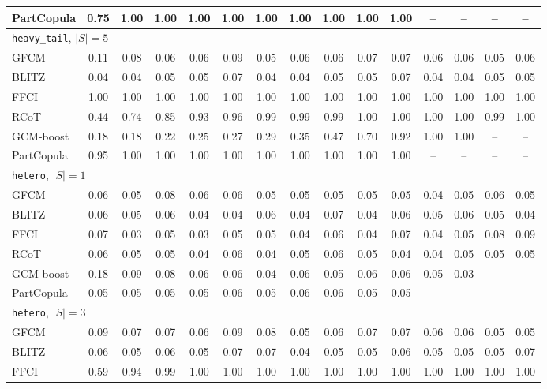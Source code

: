 \begin{longtable}{l*{14}{c}}
PartCopula & 0.75 & 1.00 & 1.00 & 1.00 & 1.00 & 1.00 & 1.00 & 1.00 & 1.00 & 1.00 & -- & -- & -- & -- \\
\midrule \multicolumn{15}{l}{\texttt{heavy\_tail}, $|S|=5$}\\
GFCM & 0.11 & 0.08 & 0.06 & 0.06 & 0.09 & 0.05 & 0.06 & 0.06 & 0.07 & 0.07 & 0.06 & 0.06 & 0.05 & 0.06 \\
BLITZ & 0.04 & 0.04 & 0.05 & 0.05 & 0.07 & 0.04 & 0.04 & 0.05 & 0.05 & 0.07 & 0.04 & 0.04 & 0.05 & 0.05 \\
FFCI & 1.00 & 1.00 & 1.00 & 1.00 & 1.00 & 1.00 & 1.00 & 1.00 & 1.00 & 1.00 & 1.00 & 1.00 & 1.00 & 1.00 \\
RCoT & 0.44 & 0.74 & 0.85 & 0.93 & 0.96 & 0.99 & 0.99 & 0.99 & 1.00 & 1.00 & 1.00 & 1.00 & 0.99 & 1.00 \\
GCM-boost & 0.18 & 0.18 & 0.22 & 0.25 & 0.27 & 0.29 & 0.35 & 0.47 & 0.70 & 0.92 & 1.00 & 1.00 & -- & -- \\
PartCopula & 0.95 & 1.00 & 1.00 & 1.00 & 1.00 & 1.00 & 1.00 & 1.00 & 1.00 & 1.00 & -- & -- & -- & -- \\
\midrule \multicolumn{15}{l}{\texttt{hetero}, $|S|=1$}\\
GFCM & 0.06 & 0.05 & 0.08 & 0.06 & 0.06 & 0.05 & 0.05 & 0.05 & 0.05 & 0.05 & 0.04 & 0.05 & 0.06 & 0.05 \\
BLITZ & 0.06 & 0.05 & 0.06 & 0.04 & 0.04 & 0.06 & 0.04 & 0.07 & 0.04 & 0.06 & 0.05 & 0.06 & 0.05 & 0.04 \\
FFCI & 0.07 & 0.03 & 0.05 & 0.03 & 0.05 & 0.05 & 0.04 & 0.06 & 0.04 & 0.07 & 0.04 & 0.05 & 0.08 & 0.09 \\
RCoT & 0.06 & 0.05 & 0.05 & 0.04 & 0.06 & 0.04 & 0.05 & 0.06 & 0.05 & 0.04 & 0.04 & 0.05 & 0.05 & 0.05 \\
GCM-boost & 0.18 & 0.09 & 0.08 & 0.06 & 0.06 & 0.04 & 0.06 & 0.05 & 0.06 & 0.06 & 0.05 & 0.03 & -- & -- \\
PartCopula & 0.05 & 0.05 & 0.05 & 0.05 & 0.06 & 0.05 & 0.06 & 0.06 & 0.05 & 0.05 & -- & -- & -- & -- \\
\midrule \multicolumn{15}{l}{\texttt{hetero}, $|S|=3$}\\
GFCM & 0.09 & 0.07 & 0.07 & 0.06 & 0.09 & 0.08 & 0.05 & 0.06 & 0.07 & 0.07 & 0.06 & 0.06 & 0.05 & 0.05 \\
BLITZ & 0.06 & 0.05 & 0.06 & 0.05 & 0.07 & 0.07 & 0.04 & 0.05 & 0.05 & 0.06 & 0.05 & 0.05 & 0.05 & 0.07 \\
FFCI & 0.59 & 0.94 & 0.99 & 1.00 & 1.00 & 1.00 & 1.00 & 1.00 & 1.00 & 1.00 & 1.00 & 1.00 & 1.00 & 1.00 \\

\end{longtable}
